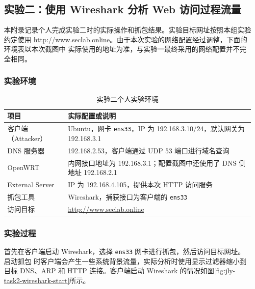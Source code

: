 
\subsection{实验二：使用 Wireshark 分析 Web 访问过程流量}

本附录记录个人完成实验二时的实际操作和抓包结果。实验目标网址按照本组实验约定使用
\url{http://www.seclab.online}。由于本次实验的网络配置经过调整，下面的环境表以本次截图中
实际使用的地址为准，与实验一最终采用的网络配置并不完全相同。

\subsubsection{实验环境}

\begin{table}[H]
    \centering
    \caption{实验二个人实验环境}
    \label{tab:jly-task2-environment}
    \small
    \renewcommand{\arraystretch}{1.35}
    \begin{tabularx}{\linewidth}{>{\raggedright\arraybackslash}p{2.8cm}X}
        \toprule
        项目 & 实际配置或说明 \\
        \midrule
        客户端（Attacker） & Ubuntu，网卡 \texttt{ens33}，IP 为 192.168.3.10/24，默认网关为 192.168.3.1 \\
        DNS 服务器 & 192.168.2.53，客户端通过 UDP 53 端口进行域名查询 \\
        OpenWRT & 内网接口地址为 192.168.3.1；配置截图中还使用了 DNS 侧地址 192.168.2.1 \\
        External Server & IP 为 192.168.4.105，提供本次 HTTP 访问服务 \\
        抓包工具 & Wireshark，捕获接口为客户端的 \texttt{ens33} \\
        访问目标 & \url{http://www.seclab.online} \\
        \bottomrule
    \end{tabularx}
\end{table}

\subsubsection{实验过程}

首先在客户端启动 Wireshark，选择 \texttt{ens33} 网卡进行抓包，然后访问目标网址。启动抓包
时客户端会产生一些系统背景流量，实际分析时使用显示过滤器缩小到目标 DNS、ARP 和 HTTP
连接。客户端启动 Wireshark 的情况如图\ref{fig:jly-task2-wireshark-start}所示。


